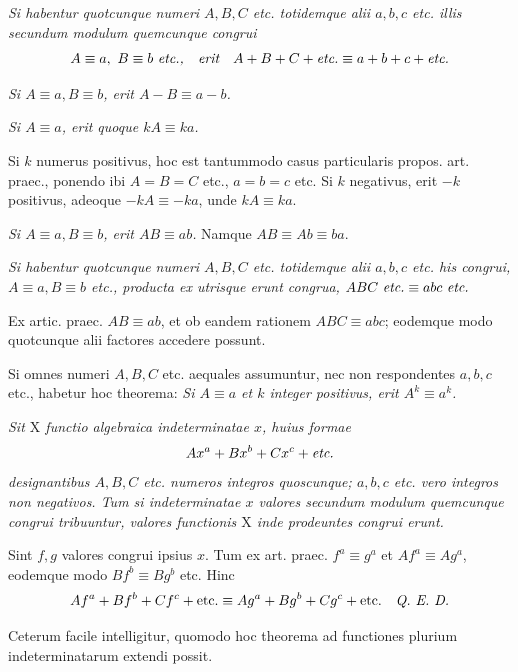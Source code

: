 
\emph{Si habentur quotcunque numeri $A, B, C$ etc. totidemque alii $a, b, c$ etc. illis secundum modulum quemcunque congrui}
\[
A\equiv a,\ B\equiv b\ \text{\itshape etc.,\quad erit}\quad A+B+C+\text{\itshape etc.}\equiv a+b+c+\text{\itshape etc.}
\]

\emph{Si $A\equiv a, B\equiv b$, erit $A-B\equiv a-b$.}


\emph{Si $A\equiv a$, erit quoque $kA\equiv ka$.}

Si $k$ numerus positivus, hoc est tantummodo casus particularis propos. art. praec., ponendo ibi $A=B=C$ etc., $a=b=c$ etc. Si $k$ negativus, erit $-k$ positivus, adeoque $-kA\equiv -ka$, unde $kA\equiv ka$.

\emph{Si $A\equiv a, B\equiv b$, erit $AB\equiv ab$.} Namque $AB\equiv Ab\equiv ba$.


\emph{Si habentur quotcunque numeri $A, B, C$ etc. totidemque alii $a, b, c$ etc. his congrui, $A\equiv a, B\equiv b$ etc., producta ex utrisque erunt congrua, $ABC\ \text{\itshape etc.}\equiv abc\ \text{\itshape etc.}$}

Ex artic. praec. $AB\equiv ab$, et ob eandem rationem $ABC\equiv abc$; eodemque modo quotcunque alii factores accedere possunt.

Si omnes numeri $A, B, C$ etc. aequales assumuntur, nec non respondentes $a, b, c$ etc., habetur hoc theorema: \emph{Si $A\equiv a$ et $k$ integer positivus, erit $A^{k}\equiv a^{k}$.}


\emph{Sit $\mathrm{X}$ functio algebraica indeterminatae $x$, huius formae}
\[
Ax^{a}+Bx^{b}+Cx^{c}+\text{\itshape etc.}
\]
\emph{designantibus $A, B, C$ etc. numeros integros quoscunque; $a, b, c$ etc. vero integros non negativos. Tum si indeterminatae $x$ valores secundum modulum quemcunque congrui tribuuntur, valores functionis $\mathrm{X}$ inde prodeuntes congrui erunt.}

Sint $f, g$ valores congrui ipsius $x$. Tum ex art. praec. $f^{a}\equiv g^{a}$ et $Af^{a}\equiv Ag^{a}$, eodemque modo $Bf^{b}\equiv Bg^{b}$ etc. Hinc
\[
Af^{a}+Bf^{b}+Cf^{c}+\text{etc.}\equiv Ag^{a}+Bg^{b}+Cg^{c}+\text{etc.}\quad\text{\itshape Q. E. D.}
\]

Ceterum facile intelligitur, quomodo hoc theorema ad functiones plurium indeterminatarum extendi possit.

